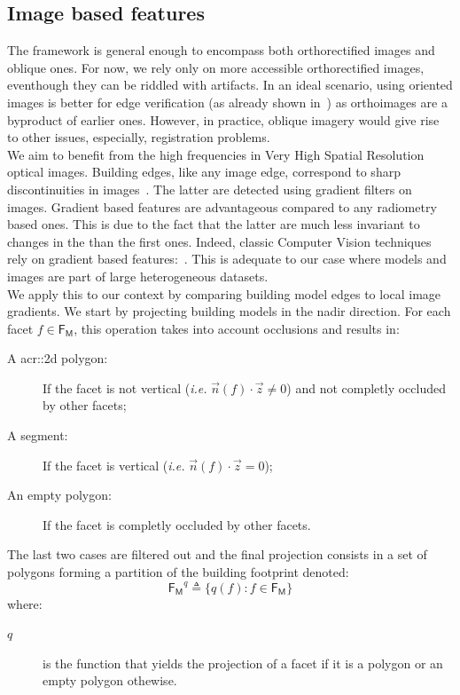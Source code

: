     \subsection{Image based features}
        \label{subsec::learned_evaluation::baseline::image}
        The framework is general enough to encompass both orthorectified images and oblique ones.
        For now, we rely only on more accessible orthorectified images, eventhough they can be riddled with artifacts.
        In an ideal scenario, using oriented images is better for edge verification (as already shown in~\parencite{michelin2013quality}) as orthoimages are a byproduct of earlier ones.
        However, in practice, oblique imagery would give rise to other issues, especially, registration problems.\\

        We aim to benefit from the high frequencies in Very High Spatial Resolution optical images.
        Building edges, like any image edge, correspond to sharp discontinuities in images~\parencite{ortner2007building}.
        The latter are detected using gradient filters on images.
        Gradient based features are advantageous compared to any radiometry based ones.
        This is due to the fact that the latter are much less invariant to changes in the than the first ones.
        Indeed, classic Computer Vision techniques rely on gradient based features:~\textcite{lowe2004distinctive,dalal2005histograms}.
        This is adequate to our case where models and images are part of large heterogeneous datasets.\\
        
        We apply this to our context by comparing building model edges to local image gradients.
        We start by projecting building models in the nadir direction.
        For each facet \(f \in \mathsf{F_M}\), this operation takes into account occlusions and results in:
        \begin{description}
            \item[A \gls{acr::2d} polygon:] If the facet is not vertical (\textit{i.e.} \(\vec{n}(f) \cdot \vec{z} \neq 0\)) and not completly occluded by other facets;
            \item[A segment:] If the facet is vertical (\textit{i.e.} \(\vec{n}(f) \cdot \vec{z} = 0\));
            \item[An empty polygon:] If the facet is completly occluded by other facets.
        \end{description}
        The last two cases are filtered out and the final projection consists in a set of polygons forming a partition of the building footprint denoted:
        \begin{equation}
            \label{eq::facet_projections}
            \mathsf{F_M}^q \triangleq \{q(f): f \in \mathsf{F_M}\}
        \end{equation}
        where:
        \begin{description}
            \item[\(q\)] is the function that yields the projection of a facet if it is a polygon or an empty polygon othewise.
        \end{description}

